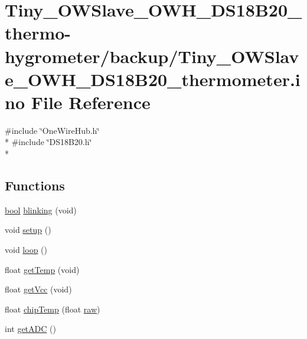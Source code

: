 \hypertarget{Tiny__OWSlave__OWH__DS18B20__thermometer_8ino}{\section{Tiny\-\_\-\-O\-W\-Slave\-\_\-\-O\-W\-H\-\_\-\-D\-S18\-B20\-\_\-thermo-\/hygrometer/backup/\-Tiny\-\_\-\-O\-W\-Slave\-\_\-\-O\-W\-H\-\_\-\-D\-S18\-B20\-\_\-thermometer.ino File Reference}
\label{Tiny__OWSlave__OWH__DS18B20__thermometer_8ino}
}
{\ttfamily \#include \char`\"{}One\-Wire\-Hub.\-h\char`\"{}}\\*
{\ttfamily \#include \char`\"{}D\-S18\-B20.\-h\char`\"{}}\\*
\subsection*{Functions}
\begin{DoxyCompactItemize}
\item 
\hyperlink{stdbool_8h_abb452686968e48b67397da5f97445f5b}{bool} \hyperlink{Tiny__OWSlave__OWH__DS18B20__thermometer_8ino_a6766eee584b84ead350781efbabe36d7}{blinking} (void)
\item 
void \hyperlink{Tiny__OWSlave__OWH__DS18B20__thermometer_8ino_a4fc01d736fe50cf5b977f755b675f11d}{setup} ()
\item 
void \hyperlink{Tiny__OWSlave__OWH__DS18B20__thermometer_8ino_afe461d27b9c48d5921c00d521181f12f}{loop} ()
\item 
float \hyperlink{Tiny__OWSlave__OWH__DS18B20__thermometer_8ino_af457592e93b296e5ea12f1cc16ec7795}{get\-Temp} (void)
\item 
float \hyperlink{Tiny__OWSlave__OWH__DS18B20__thermometer_8ino_acd16ee68f07b74cf5f62870589bf3d70}{get\-Vcc} (void)
\item 
float \hyperlink{Tiny__OWSlave__OWH__DS18B20__thermometer_8ino_a5b76ffb3e5fc286906bbbaf521534288}{chip\-Temp} (float \hyperlink{Uno__MultiWii__HardwarePlatform__Test_2Sensors_8cpp_a2ac761123eb9aa3dacd85dc88d857939}{raw})
\item 
int \hyperlink{Tiny__OWSlave__OWH__DS18B20__thermometer_8ino_a8d577da9db3345495d3bf210b0520b39}{get\-A\-D\-C} ()
\end{DoxyCompactItemize}
